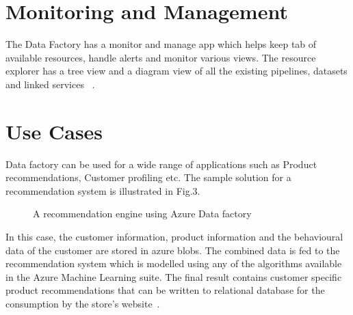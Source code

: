 \documentclass[9pt,twocolumn,twoside]{styles/osajnl}
\begin{document}
\section{Monitoring and Management}
The Data Factory has a monitor and manage app which helps keep tab of available resources, handle alerts and monitor various views. The resource explorer has a tree view and a diagram view of all the existing pipelines, datasets and linked services ~\cite{www-microsoft-azure-moniter}.

\section{Use Cases}
Data factory can be used for a wide range of applications such as Product recommendations, Customer profiling etc. The sample solution for a recommendation system is illustrated in Fig.3.
\begin{figure}[htbp]
\centering
{}
\caption{A recommendation engine using Azure Data factory ~\cite{www-microsoft-azure-reco}}
\label{fig:copy-local}
\end{figure}
In this case, the customer information, product information and the behavioural data of the customer are stored in azure blobs. The combined data is fed to the recommendation system which is modelled using any of the algorithms available in the Azure Machine Learning suite. The final result contains customer specific product recommendations that can be written to relational database for the consumption by the store's website~\cite{www-microsoft-azure-reco}.
\end{document}

